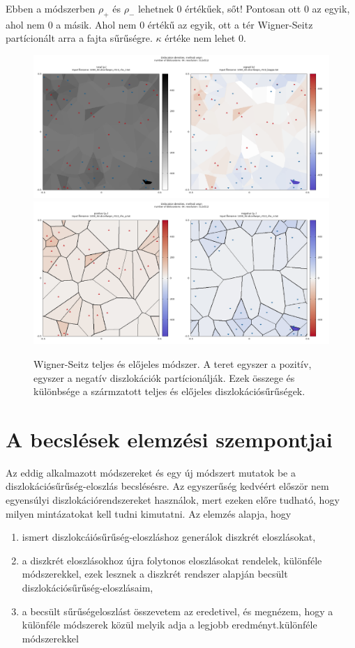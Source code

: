 \documentclass[10pt,a4paper]{scrartcl}
\begin{document}
Ebben a módszerben $\rho_+$ és $\rho_-$ lehetnek 0 értékűek, sőt! Pontosan ott 0 az egyik, ahol nem 0 a másik. Ahol nem 0 értékű az egyik, ott a tér Wigner-Seitz partícionált arra a fajta sűrűségre. $\kappa$ értéke nem lehet 0.

\begin{center}
\begin{figure}
\includegraphics[width=\textwidth]{"../xpattern/example_with_64_dislocations/1000_64.dconfwspn_r512_ts.txt"}
\includegraphics[width=\textwidth]{"../xpattern/example_with_64_dislocations/1000_64.dconfwspn_r512_pn.txt"}
\caption{Wigner-Seitz teljes és előjeles módszer. A teret egyszer a pozitív, egyszer a negatív diszlokációk partícionálják. Ezek összege és különbsége a szármzatott teljes és előjeles diszlokációsűrűségek.}
\end{figure}
\end{center}

\section{A becslések elemzési szempontjai}
Az eddig alkalmazott módszereket és egy új módszert mutatok be a diszlokációsűrűség-eloszlás becslésésre. Az egyszerűség kedvéért először nem egyensúlyi diszlokációrendszereket használok, mert ezeken előre tudható, hogy milyen mintázatokat kell tudni kimutatni. Az elemzés alapja, hogy
\begin{enumerate}
    \item ismert diszlokcáiósűrűség-eloszláshoz generálok diszkrét eloszlásokat,
    \item a diszkrét eloszlásokhoz újra folytonos eloszlásokat rendelek, különféle módszerekkel, ezek lesznek a diszkrét rendszer alapján becsült diszlokációsűrűség-eloszlásaim,
    \item a becsült sűrűségeloszlást összevetem az eredetivel, és megnézem, hogy a különféle módszerek közül melyik adja a legjobb eredményt.különféle módszerekkel
\end{enumerate}
\end{document}
